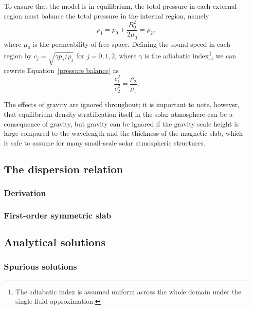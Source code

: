 \documentclass[12pt]{../style-files/ociamthesis}
\begin{document}
To ensure that the model is in equilibrium, the total pressure in each external region must balance the total pressure in the internal region, namely
\begin{equation}
	p_1 = p_0 + \frac{B_0^2}{2\mu_0} = p_2, \label{pressure balance}
\end{equation}
where $\mu_0$ is the permeability of free space. Defining the sound speed in each region by $c_j=\sqrt{\gamma p_j/\rho_j}$ for $j = 0, 1, 2$, where $\gamma$ is the adiabatic index\footnote{The adiabatic index is assumed uniform across the whole domain under the single-fluid approximation.}, we can rewrite Equation~\eqref{pressure balance} as
\begin{equation}
\frac{c_1^2}{c_2^2}=\frac{\rho_2}{\rho_1}. \label{sound speeds}
\end{equation}







The effects of gravity are ignored throughout; it is important to note, however, that equilibrium density stratification itself in the solar atmosphere can be a consequence of gravity, but gravity can be ignored if the gravity scale height is large compared to the wavelength and the thickness of the magnetic slab, which is safe to assume for many small-scale solar atmospheric structures.





\subsection{The dispersion relation}

\subsubsection{Derivation}

\subsubsection{First-order symmetric slab}

\subsection{Analytical solutions}

\subsubsection{Spurious solutions}
\end{document}
